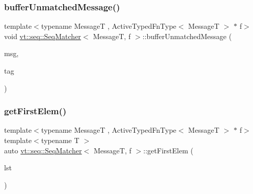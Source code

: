 \mbox{\label{structvt_1_1seq_1_1_seq_matcher_a1dc8c34d3611f4eac7e21089e1484e52}} 
\subsubsection{\texorpdfstring{buffer\+Unmatched\+Message()}{bufferUnmatchedMessage()}}
{\footnotesize\ttfamily template$<$typename MessageT , Active\+Typed\+Fn\+Type$<$ Message\+T $>$ $\ast$ f$>$ \\
void \hyperlink{structvt_1_1seq_1_1_seq_matcher}{vt\+::seq\+::\+Seq\+Matcher}$<$ MessageT, f $>$\+::buffer\+Unmatched\+Message (\begin{DoxyParamCaption}\item[{\hyperlink{namespacevt_ab2b3d506ec8e8d1540aede826d84a239}{Msg\+Shared\+Ptr}$<$ MessageT $>$}]{msg,  }\item[{\hyperlink{namespacevt_a84ab281dae04a52a4b243d6bf62d0e52}{Tag\+Type} const \&}]{tag }\end{DoxyParamCaption})\hspace{0.3cm}{\ttfamily [static]}}

\mbox{\label{structvt_1_1seq_1_1_seq_matcher_a159105deac6c551431f83a6e4923ced2}} 
\subsubsection{\texorpdfstring{get\+First\+Elem()}{getFirstElem()}}
{\footnotesize\ttfamily template$<$typename MessageT , Active\+Typed\+Fn\+Type$<$ Message\+T $>$ $\ast$ f$>$ \\
template$<$typename T $>$ \\
auto \hyperlink{structvt_1_1seq_1_1_seq_matcher}{vt\+::seq\+::\+Seq\+Matcher}$<$ MessageT, f $>$\+::get\+First\+Elem (\begin{DoxyParamCaption}\item[{T \&}]{lst }\end{DoxyParamCaption})\hspace{0.3cm}{\ttfamily [static]}}

